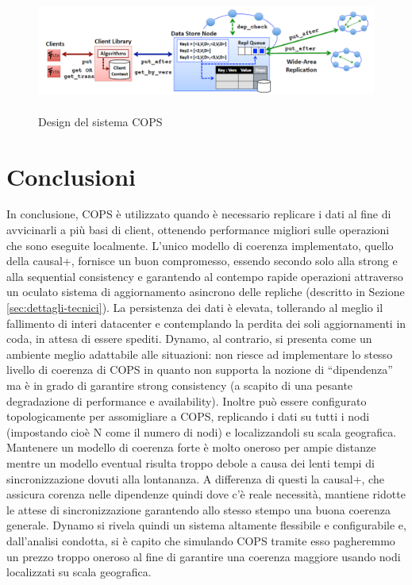 \documentclass[twoside]{article}
\begin{document}
\begin{multicols}{2}
\begin{figure}[t]
\centering
\includegraphics[width=\textwidth,height=4cm]{img/COPSdesign.png}
\caption{Design del sistema COPS}
\label{fig:COPSdesign}
\end{figure}

\section{Conclusioni}
In conclusione, COPS è utilizzato quando è necessario replicare i dati al fine di avvicinarli a più basi di client, ottenendo performance migliori sulle operazioni che sono eseguite localmente. L'unico modello di coerenza implementato, quello della causal+, fornisce un buon compromesso, essendo secondo solo alla strong e alla sequential consistency e garantendo al contempo rapide operazioni attraverso un oculato sistema di aggiornamento asincrono delle repliche (descritto in Sezione \ref{sec:dettagli-tecnici}). La persistenza dei dati è elevata, tollerando al meglio il fallimento di interi datacenter e contemplando la perdita dei soli aggiornamenti in coda, in attesa di essere spediti.
Dynamo, al contrario, si presenta come un ambiente meglio adattabile alle situazioni: non riesce ad implementare lo stesso livello di coerenza di COPS in quanto non supporta la nozione di ``dipendenza'' ma è in grado di garantire strong consistency (a scapito di una pesante degradazione di performance e availability). Inoltre può essere configurato topologicamente per assomigliare a COPS, replicando i dati su tutti i nodi (impostando cioè N come il numero di nodi) e localizzandoli su scala geografica. Mantenere un modello di coerenza forte è molto oneroso per ampie distanze mentre un modello eventual risulta troppo debole a causa dei lenti tempi di sincronizzazione dovuti alla lontananza. A differenza di questi la causal+, che assicura corenza nelle dipendenze quindi dove c'è reale necessità, mantiene ridotte le attese di sincronizzazione garantendo allo stesso stempo una buona coerenza generale. Dynamo si rivela quindi un sistema altamente flessibile e configurabile e, dall'analisi condotta, si è capito che simulando COPS tramite esso pagheremmo un prezzo troppo oneroso al fine di garantire una coerenza maggiore usando nodi localizzati su scala geografica. 


\end{multicols}
\end{document}
